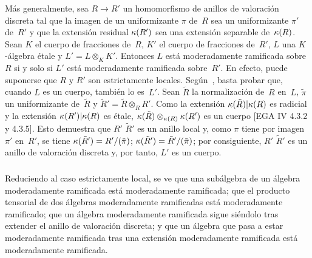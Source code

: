Más generalmente, sea $R\to R'$ un homomorfismo de anillos de valoración
discreta tal que la imagen de un uniformizante $\pi$ de~$R$ sea un
uniformizante $\pi'$ de~$R'$ y que la extensión residual $\kappa(R')$ sea una
extensión separable de~$\kappa(R)$. Sean $K$ el cuerpo de fracciones de~$R$,
$K'$ el cuerpo de fracciones de~$R'$, $L$ una $K$-álgebra étale y
$L'=L\otimes_KK'$. Entonces $L$ está moderadamente ramificada sobre~$R$ si y
solo si $L'$ está moderadamente ramificada sobre~$R'$. En efecto, puede
suponerse que $R$ y $R'$ son estrictamente locales. Según~,
basta probar que, cuando $L$ es un cuerpo, también lo es~$L'$. Sean
$\tilde{R}$ la normalización de~$R$ en~$L$, $\tilde{\pi}$ un
uniformizante de~$\tilde{R}$ y
$\tilde{R}'=\tilde{R}\otimes_RR'$. Como la extensión
$\kappa(\tilde{R})|\kappa(R)$ es radicial y la extensión
$\kappa(R')|\kappa(R)$ es étale,
$\kappa(\tilde{R})\otimes_{\kappa(R)}\kappa(R')$ es un cuerpo [EGA IV 4.3.2
y 4.3.5]. Esto demuestra que
{$R'$}
{$\tilde{R}'$}
es un anillo local y, como $\pi$ tiene por imagen $\pi'$ en~$R'$, se tiene
{$\kappa(\tilde{R}')=R'/(\tilde{\pi})$;}
{$\kappa(\tilde{R}')=\tilde{R}'/(\tilde{\pi})$;}
por consiguiente,
{$R'$}
{$\tilde{R}'$}
es un anillo de valoración discreta
\cite[ch\ptbl I \S 2 prop]{XIII.5} y, por tanto, $L'$ es un cuerpo.

\subsubsection{}
\label{XIII.2.0.3}
Reduciendo al caso estrictamente local, se ve que una subálgebra de un
álgebra moderadamente ramificada está moderadamente ramificada; que el
producto tensorial de dos álgebras moderadamente ramificadas está
moderadamente ramificado; que un álgebra moderadamente ramificada sigue
siéndolo tras extender el anillo de valoración discreta; y que un álgebra
que pasa a estar moderadamente ramificada tras una extensión moderadamente
ramificada está moderadamente ramificada.
